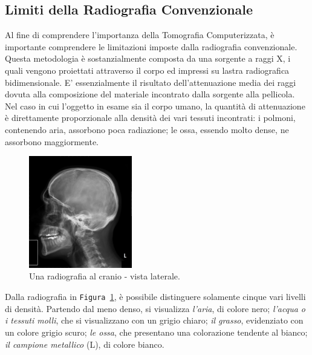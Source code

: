 \documentclass[a4paper,12pt, doubleside]{report}
\begin{document}
            \subsection{Limiti della Radiografia Convenzionale}
                \par
                    Al fine di comprendere l'importanza della Tomografia Computerizzata, è importante comprendere le limitazioni imposte dalla radiografia convenzionale. Questa metodologia è sostanzialmente composta da una sorgente a raggi X, i quali vengono proiettati attraverso il corpo ed impressi su lastra radiografica bidimensionale. E’ essenzialmente il risultato dell’attenuazione media\cite{hounsfield-nobel-lecture} dei raggi dovuta alla composizione del materiale incontrato dalla sorgente alla pellicola. Nel caso in cui l’oggetto in esame sia il corpo umano, la quantità di attenuazione è direttamente proporzionale alla densità dei vari tessuti incontrati: i polmoni, contenendo aria, assorbono poca radiazione; le ossa, essendo molto dense, ne assorbono maggiormente.
                            
                    \begin{figure}[h]
                        \centering
                        \includegraphics[width=0.4\textwidth]{radiografia}
                        \caption{Una radiografia al cranio - vista laterale.}
                        \label{fig:skull}
                    \end{figure}
                        
                    Dalla radiografia in \texttt{Figura \ref{fig:skull}}, è possibile distinguere solamente cinque vari livelli di densità. Partendo dal meno denso, si visualizza \textit{l'aria}, di colore nero; \textit{l'acqua o i tessuti molli}, che si visualizzano con un grigio chiaro; \textit{il grasso}, evidenziato con un colore grigio scuro; \textit{le ossa}, che presentano una colorazione tendente al bianco; \textit{il campione metallico} (L), di colore bianco.
                            
\end{document}
